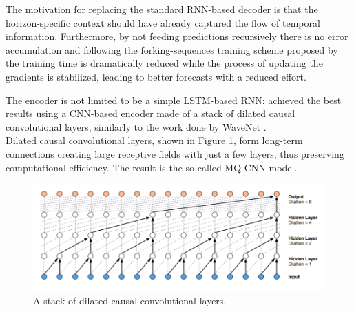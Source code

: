 \documentclass[a4paper, 12pt]{article} %
\begin{document}
	The motivation for replacing the standard RNN-based decoder is that the horizon-specific context should have already captured the flow of temporal information. Furthermore, by not feeding predictions recursively there is no error accumulation and following the forking-sequences training scheme proposed by \cite{MQCNN} the training time is dramatically reduced while the process of updating the gradients is stabilized, leading to better forecasts with a reduced effort.
	
	The encoder is not limited to be a simple LSTM-based RNN: \cite{MQCNN} achieved the best results using a CNN-based encoder made of a stack of dilated causal convolutional layers, similarly to the work done by WaveNet \cite{Wavenet}.\\
	Dilated causal convolutional layers, shown in Figure \ref{fig:dilated_cnn}, form long-term connections creating large receptive fields with just a few layers, thus preserving computational efficiency. The result is the so-called MQ-CNN model.
	\begin{figure}
		\includegraphics[width=\linewidth]{img/wavenet.png}
		\caption{A stack of dilated causal convolutional layers.}
		\label{fig:dilated_cnn}
	\end{figure}
	
	
\end{document}

